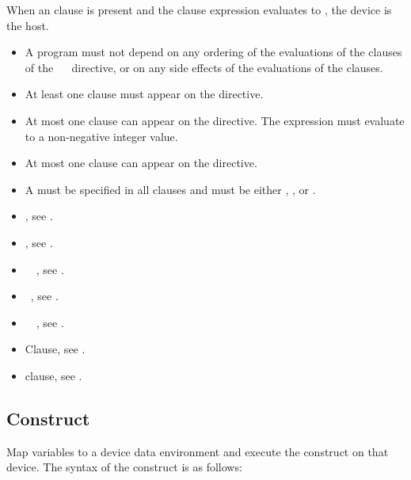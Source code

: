 {{When an  clause is present and the  clause expression evaluates to , the device is the host. 
\restrictions
\begin{itemize}
\item A program must not depend on any ordering of the evaluations of the clauses of the ~~ directive, or on any side effects of the evaluations of the clauses.
\item At least one  clause must appear on the directive.
\item At most one  clause can appear on the directive. The  expression must evaluate to a non-negative integer value.
\item At most one  clause can appear on the directive.
\item A  must be specified in all  clauses and must be either , , or .
\end{itemize}

\crossreferences
\begin{itemize}
\item {}, see .

\item {}, see .

\item {}~~, 
      see . 

\item {}~, see .

\item {}~~, 
      see .

\item {} Clause, see .

\item {} clause, see .
\end{itemize}





\pagebreak

\subsection{ Construct}
\label{subsec:target Construct}
\summary
Map variables to a device data environment and execute the construct on that device.
\syntax
\ccppspecificstart
The syntax of the  construct is as follows:

}}
